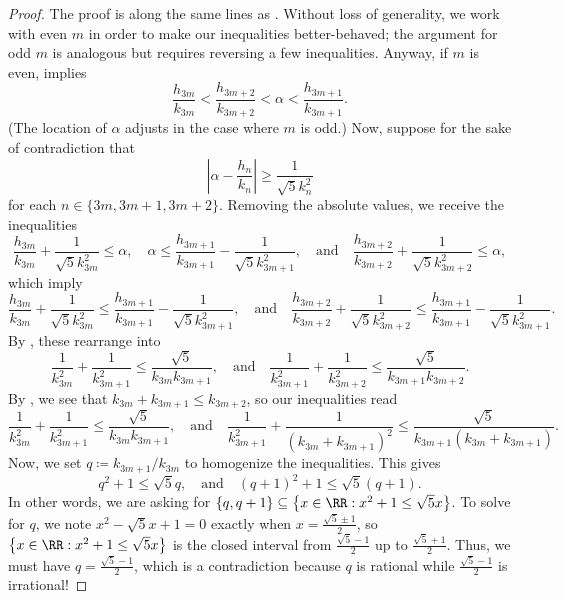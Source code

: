 \documentclass[../notes.tex]{subfiles}
\begin{document}
\begin{proof}
	The proof is along the same lines as . Without loss of generality, we work with even $m$ in order to make our inequalities better-behaved; the argument for odd $m$ is analogous but requires reversing a few inequalities. Anyway, if $m$ is even,  implies
	\[\frac{h_{3m}}{k_{3m}}<\frac{h_{3m+2}}{k_{3m+2}}<\alpha<\frac{h_{3m+1}}{k_{3m+1}}.\]
	(The location of $\alpha$ adjusts in the case where $m$ is odd.) Now, suppose for the sake of contradiction that
	\[\left|\alpha-\frac{h_n}{k_n}\right|\ge\frac1{\sqrt 5k_n^2}\]
	for each $n\in\{3m,3m+1,3m+2\}$. Removing the absolute values, we receive the inequalities
	\[\frac{h_{3m}}{k_{3m}}+\frac1{\sqrt5k_{3m}^2}\le\alpha,\quad\alpha\le\frac{h_{3m+1}}{k_{3m+1}}-\frac1{\sqrt5k_{3m+1}^2},\quad\text{and}\quad\frac{h_{3m+2}}{k_{3m+2}}+\frac1{\sqrt5k_{3m+2}^2}\le\alpha,\]
	which imply
	\[\frac{h_{3m}}{k_{3m}}+\frac1{\sqrt5k_{3m}^2}\le\frac{h_{3m+1}}{k_{3m+1}}-\frac1{\sqrt5k_{3m+1}^2},\quad\text{and}\quad\frac{h_{3m+2}}{k_{3m+2}}+\frac1{\sqrt5k_{3m+2}^2}\le\frac{h_{3m+1}}{k_{3m+1}}-\frac1{\sqrt5k_{3m+1}^2}.\]
	By , these rearrange into
	\[\frac1{k_{3m}^2}+\frac1{k_{3m+1}^2}\le\frac{\sqrt5}{k_{3m}k_{3m+1}},\quad\text{and}\quad\frac1{k_{3m+1}^2}+\frac1{k_{3m+2}^2}\le\frac{\sqrt5}{k_{3m+1}k_{3m+2}}.\]
	By , we see that $k_{3m}+k_{3m+1}\le k_{3m+2}$, so our inequalities read
	\[\frac1{k_{3m}^2}+\frac1{k_{3m+1}^2}\le\frac{\sqrt5}{k_{3m}k_{3m+1}},\quad\text{and}\quad\frac1{k_{3m+1}^2}+\frac1{(k_{3m}+k_{3m+1})^2}\le\frac{\sqrt5}{k_{3m+1}(k_{3m}+k_{3m+1})}.\]
	Now, we set $q\coloneqq k_{3m+1}/k_{3m}$ to homogenize the inequalities. This gives
	\[q^2+1\le\sqrt5q,\quad\text{and}\quad(q+1)^2+1\le\sqrt5(q+1).\]
	In other words, we are asking for $\{q,q+1\}\subseteq\left\{x\in\RR:x^2+1\le\sqrt 5x\right\}$. To solve for $q$, we note $x^2-\sqrt5x+1=0$ exactly when $x=\frac{\sqrt5\pm1}2$, so $\left\{x\in\RR:x^2+1\le\sqrt 5x\right\}$ is the closed interval from $\frac{\sqrt5-1}2$ up to $\frac{\sqrt5+1}2$. Thus, we must have $q=\frac{\sqrt5-1}2$, which is a contradiction because $q$ is rational while $\frac{\sqrt5-1}2$ is irrational!
\end{proof}
\end{document}
